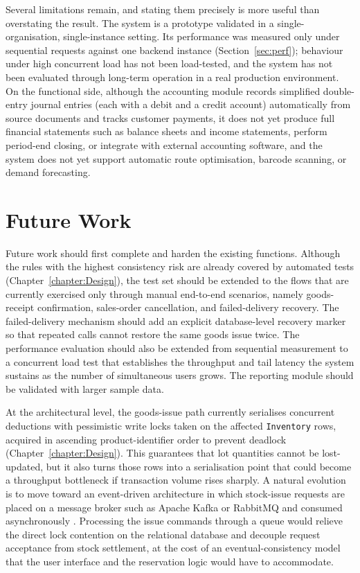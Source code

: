 Several limitations remain, and stating them precisely is more useful than
overstating the result. The system is a prototype validated in a
single-organisation, single-instance setting. Its performance was measured only
under sequential requests against one backend instance
(Section~\ref{sec:perf}); behaviour under high concurrent load has not been
load-tested, and the system has not been evaluated through long-term operation
in a real production environment. On the functional side, although the
accounting module records simplified double-entry journal entries (each with a
debit and a credit account) automatically from source documents and tracks
customer payments, it does not yet produce full financial statements such as
balance sheets and income statements, perform period-end closing, or integrate
with external accounting software, and the system does not yet support automatic
route optimisation, barcode scanning, or demand forecasting.

\section{Future Work}
Future work should first complete and harden the existing functions. Although the
rules with the highest consistency risk are already covered by automated tests
(Chapter~\ref{chapter:Design}), the test set should be extended to the flows that
are currently exercised only through manual end-to-end scenarios, namely
goods-receipt confirmation, sales-order cancellation, and failed-delivery
recovery. The failed-delivery mechanism should add an explicit
database-level recovery marker so that repeated calls cannot restore the same
goods issue twice. The performance evaluation should also be extended from
sequential measurement to a concurrent load test that establishes the
throughput and tail latency the system sustains as the number of simultaneous
users grows. The reporting module should be validated with larger sample data.

At the architectural level, the goods-issue path currently serialises concurrent
deductions with pessimistic write locks taken on the affected \texttt{Inventory}
rows, acquired in ascending product-identifier order to prevent deadlock
(Chapter~\ref{chapter:Design}). This guarantees that lot quantities cannot be
lost-updated, but it also turns those rows into a serialisation point that could
become a throughput bottleneck if transaction volume rises sharply. A natural
evolution is to move toward an event-driven architecture in which stock-issue
requests are placed on a message broker such as Apache Kafka or RabbitMQ and
consumed asynchronously \cite{hohpe2003eip, kleppmann2017ddia}. Processing the
issue commands through a queue would relieve the direct lock contention on the
relational database and decouple request acceptance from stock settlement, at
the cost of an eventual-consistency model that the user interface and the
reservation logic would have to accommodate.

